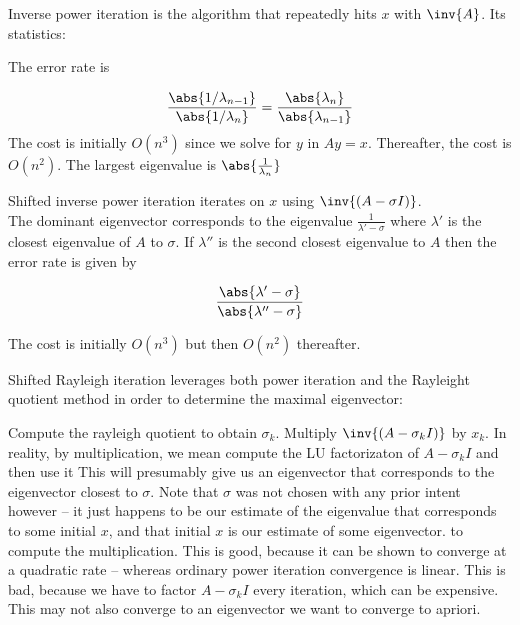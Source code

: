 \documentclass[../main.tex]{subfiles}
\begin{document}
\begin{definition}
    Inverse power iteration is the algorithm that repeatedly hits $x$ with $\inv{A}$. Its statistics:

    \begin{outline}
        \1 The error rate is 

        \[
            \frac{\abs{1/\lambda_{n-1}}}{\abs{1/\lambda_{n}}} = \frac{\abs{\lambda_n}}{\abs{\lambda_{n-1}}} 
        \]
        \1 The cost is initially $O(n^3)$ since we solve for $y$ in $Ay = x$. Thereafter, the cost is $O(n^2)$.
        \1 The largest eigenvalue is $\abs{\frac{1}{\lambda_n}}$
    \end{outline}
\end{definition}

\begin{definition}
    Shifted inverse power iteration iterates on $x$ using $\inv{(A - \sigma I)}$. \\

    The dominant eigenvector corresponds to the eigenvalue $\frac{1}{\lambda' - \sigma}$ where $\lambda'$ is the closest eigenvalue of $A$ to $\sigma$. If $\lambda''$ is the second closest eigenvalue to $A$ then the error rate is given by 

    \[
        \frac{\abs{\lambda' - \sigma}}{\abs{\lambda'' - \sigma}}
    \]

    The cost is initially $O(n^3)$ but then $O(n^2)$ thereafter.

\end{definition}

\begin{definition}
    Shifted Rayleigh iteration leverages both power iteration and the Rayleight quotient method in order to determine the maximal eigenvector:
    \begin{outline}
        \1 Compute the rayleigh quotient to obtain $\sigma_k$.
        \2 Multiply $\inv{(A -\sigma_k I)}$ by $x_k$.
        \3 In reality, by multiplication, we mean compute the
        LU factorizaton of $A - \sigma_k I$ and then use it
        \1 This will presumably give us an eigenvector that corresponds
        to the eigenvector closest to $\sigma$.
        \2 Note that $\sigma$ was not chosen with any prior intent however -- it just happens to be our estimate of the eigenvalue that corresponds to some initial $x$, and that initial $x$ is our estimate of some eigenvector.
        to compute the multiplication.
        \1 This is good, because it can be shown to converge
        at a quadratic rate -- whereas ordinary power iteration
        convergence is linear.
        \2 This is bad, because we have to factor
        $A - \sigma_k I$ every iteration, which can be expensive.
        \2 This may not also converge to an eigenvector we want to converge to apriori.
    \end{outline}
\end{definition}
\end{document}
